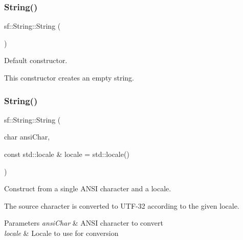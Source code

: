 \subsubsection{\texorpdfstring{String()}{String()}\hspace{0.1cm}{\footnotesize\ttfamily [1/11]}}
{\footnotesize\ttfamily sf\+::\+String\+::\+String (\begin{DoxyParamCaption}{ }\end{DoxyParamCaption})}



Default constructor. 

This constructor creates an empty string. \begin{DoxyVerb}\end{DoxyVerb}
 \mbox{\label{classsf_1_1_string_ac9df7f7696cff164794e338f3c89ccc5}} 
\subsubsection{\texorpdfstring{String()}{String()}\hspace{0.1cm}{\footnotesize\ttfamily [2/11]}}
{\footnotesize\ttfamily sf\+::\+String\+::\+String (\begin{DoxyParamCaption}\item[{char}]{ansi\+Char,  }\item[{const std\+::locale \&}]{locale = {\ttfamily std\+:\+:locale()} }\end{DoxyParamCaption})}



Construct from a single A\+N\+SI character and a locale. 

The source character is converted to U\+T\+F-\/32 according to the given locale.


\begin{DoxyParams}{Parameters}
{\em ansi\+Char} & A\+N\+SI character to convert \\
\hline
{\em locale} & Locale to use for conversion \begin{DoxyVerb}\end{DoxyVerb}
 \\
\hline
\end{DoxyParams}
\mbox{\label{classsf_1_1_string_aefaa202d2aa5ff85b4f75a5983367e86}} 
